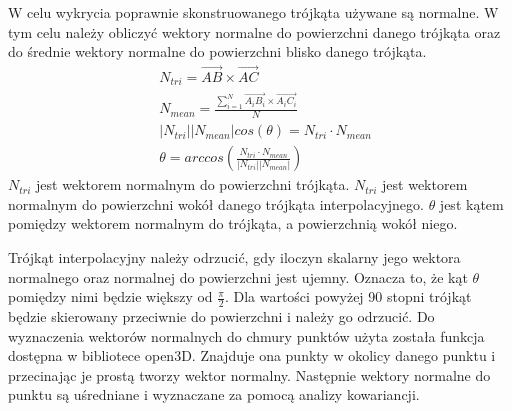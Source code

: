 W celu wykrycia poprawnie skonstruowanego trójkąta używane są normalne. W tym celu należy obliczyć wektory normalne do powierzchni danego trójkąta oraz do średnie wektory normalne do powierzchni blisko danego trójkąta. 
\begin{equation}
    \begin{aligned}
            &N_{tri}=\vec{AB} \times \vec{AC}\\
            &N_{mean}=\frac{\sum_{i=1}^{N} \vec{A_{i}B_{i}} \times \vec{A_{i}C_{i}}}{N}\\
            & |N_{tri}||N_{mean}|cos(\theta)=N_{tri} \cdot N_{mean}\\
            &\theta=arccos(\frac{N_{tri} \cdot N_{mean}}{|N_{tri}||N_{mean}|})

    \end{aligned}
\end{equation}
$N_{tri}$ jest wektorem normalnym do powierzchni trójkąta. $N_{tri}$ jest wektorem normalnym do powierzchni wokół danego trójkąta interpolacyjnego. $\theta$ jest kątem pomiędzy wektorem normalnym do trójkąta, a powierzchnią wokół niego. 

Trójkąt interpolacyjny należy odrzucić, gdy iloczyn skalarny jego wektora normalnego oraz normalnej do powierzchni jest ujemny. Oznacza to, że kąt $\theta$ pomiędzy nimi będzie większy od $\frac{\pi}{2}$. Dla wartości powyżej 90 stopni trójkąt będzie skierowany przeciwnie do powierzchni i należy go odrzucić. Do wyznaczenia wektorów normalnych do chmury punktów użyta została funkcja dostępna w bibliotece open3D. Znajduje ona punkty w okolicy danego punktu i przecinając je prostą tworzy wektor normalny. Następnie wektory normalne do punktu są uśredniane i wyznaczane za pomocą analizy kowariancji.
